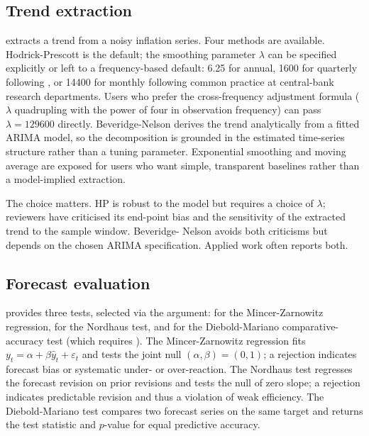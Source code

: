 \subsection{Trend extraction}\label{trend-extraction}

 extracts a trend from
a noisy inflation series. Four methods are available. Hodrick-Prescott
is the default; the smoothing parameter \(\lambda\) can be specified
explicitly or left to a frequency-based default: 6.25 for annual, 1600
for quarterly following \citet{hodrick1997postwar}, or 14400 for monthly
following common practice at central-bank research departments. Users
who prefer the \citet{ravn2002adjusting} cross-frequency adjustment
formula (\(\lambda\) quadrupling with the power of four in observation
frequency) can pass \(\lambda = 129600\) directly. Beveridge-Nelson
derives the trend analytically from a fitted ARIMA model, so the
decomposition is grounded in the estimated time-series structure rather
than a tuning parameter. Exponential smoothing and moving average are
exposed for users who want simple, transparent baselines rather than a
model-implied extraction.

The choice matters. HP is robust to the model but requires a choice of
\(\lambda\); reviewers have criticised its end-point bias and the
sensitivity of the extracted trend to the sample window. Beveridge-
Nelson avoids both criticisms but depends on the chosen ARIMA
specification. Applied work often reports both.

\subsection{Forecast evaluation}\label{forecast-evaluation}


provides three tests, selected via the  argument:
 for the Mincer-Zarnowitz regression, 
for the Nordhaus test, and  for the Diebold-Mariano
comparative-accuracy test (which requires ). The
Mincer-Zarnowitz regression fits \(y_t = \alpha +
\beta \hat y_t + \varepsilon_t\) and tests the joint null
\((\alpha, \beta) = (0, 1)\); a rejection indicates forecast bias or
systematic under- or over-reaction. The Nordhaus test regresses the
forecast revision on prior revisions and tests the null of zero slope; a
rejection indicates predictable revision and thus a violation of weak
efficiency. The Diebold-Mariano test compares two forecast series on the
same target and returns the test statistic and \(p\)-value for equal
predictive accuracy.

